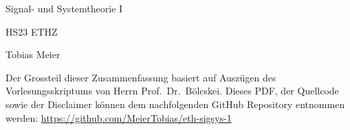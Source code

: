 \documentclass[a4paper,10pt,landscape]{scrartcl}
\begin{document}
\begin{multicols*}{3}

    \begin{center}
        \huge{Signal- und Systemtheorie I \par}
        \vspace{0.1cm}
        \large{HS23 ETHZ\par}
        \vspace{0.3cm}
        \normalsize{Tobias Meier}
        \vspace{0.3cm}
    \end{center}
    {
    Der Grossteil dieser Zusammenfassung basiert auf Auszügen des Vorlesungsskriptums von Herrn Prof.\ Dr.\ Bölcskei.\newline{}
    Dieses PDF, der Quellcode sowie der Disclaimer können dem nachfolgenden GitHub Repository entnommen werden: \url{https://github.com/MeierTobias/eth-sigsys-1}
    }
    \vspace{0.2cm}

    

    

    

    

    

    

    

    

    

    

    

    


\end{multicols*}
\end{document}
